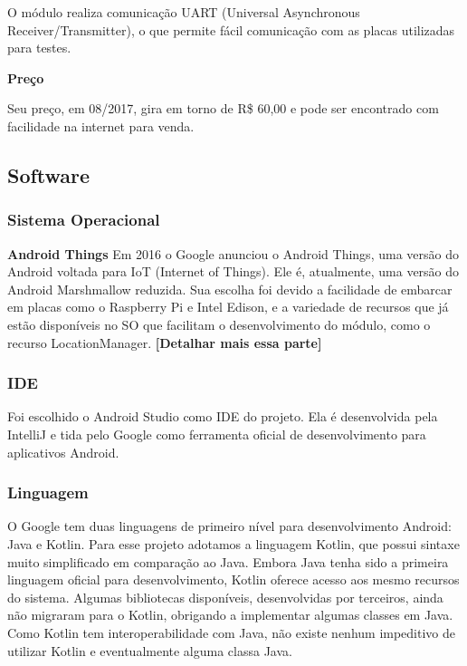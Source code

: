 \documentclass[
	12pt,				%
	oneside,			%
	a4paper,			%
	brazil				%
]{abntex2}
\begin{document}
O módulo realiza comunicação UART (Universal Asynchronous Receiver/Transmitter), o que permite fácil comunicação com as placas utilizadas para testes.

\textbf{Preço}

Seu preço, em 08/2017, gira em torno de R\$ 60,00 e pode ser encontrado com facilidade na internet para venda. 


\subsection{Software}

\subsubsection{Sistema Operacional}

\textbf{Android Things}
Em 2016 o Google anunciou o Android Things, uma versão do Android voltada para IoT (Internet of Things). Ele é, atualmente, uma versão do Android Marshmallow reduzida. Sua escolha foi devido a facilidade de embarcar em placas como o Raspberry Pi e Intel Edison, e a variedade de recursos que já estão disponíveis no SO que facilitam o desenvolvimento do módulo, como o recurso LocationManager. \textbf{[Detalhar mais essa parte]}

\subsubsection{IDE}

Foi escolhido o Android Studio como IDE do projeto. Ela é desenvolvida pela IntelliJ e tida pelo Google como ferramenta oficial de desenvolvimento para aplicativos Android.

\subsubsection{Linguagem}

O Google tem duas linguagens de primeiro nível para desenvolvimento Android: Java e Kotlin. Para esse projeto adotamos a linguagem Kotlin, que possui sintaxe muito simplificado em comparação ao Java. Embora Java tenha sido a primeira linguagem oficial para desenvolvimento, Kotlin oferece acesso aos mesmo recursos do sistema.
Algumas bibliotecas disponíveis, desenvolvidas por terceiros, ainda não migraram para o Kotlin, obrigando a implementar algumas classes em Java. Como Kotlin tem interoperabilidade com Java, não existe nenhum impeditivo de utilizar Kotlin e eventualmente alguma classa Java.
\end{document}
